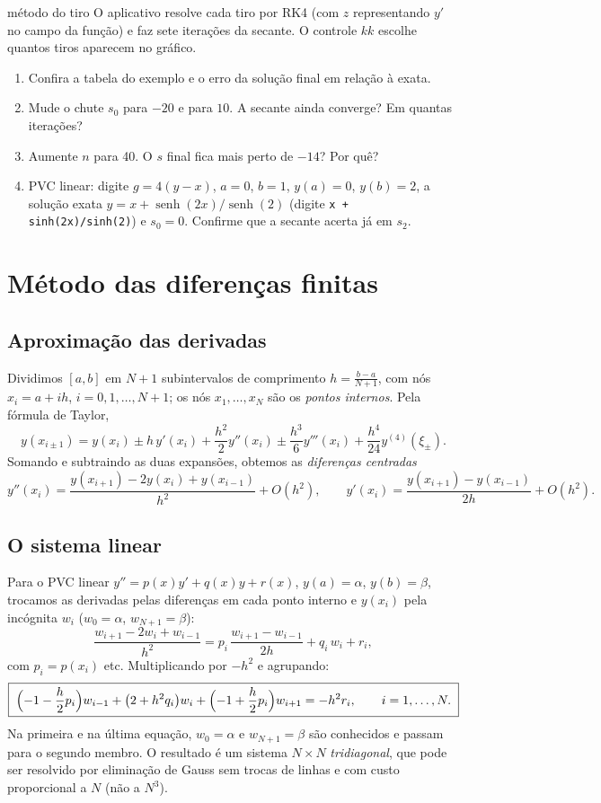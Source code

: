 \begin{atividade}{método do tiro}{\arqTiro}
O aplicativo resolve cada tiro por RK4 (com $z$ representando $y'$ no campo da função) e faz
sete iterações da secante. O controle $kk$ escolhe quantos tiros aparecem no gráfico.
\begin{enumerate}[nosep]
  \item Confira a tabela do exemplo e o erro da solução final em relação à exata.
  \item Mude o chute $s_0$ para $-20$ e para $10$. A secante ainda converge? Em quantas iterações?
  \item Aumente $n$ para 40. O $s$ final fica mais perto de $-14$? Por quê?
  \item PVC linear: digite $g=4(y-x)$, $a=0$, $b=1$, $y(a)=0$, $y(b)=2$, a solução exata
        $y=x+\operatorname{senh}(2x)/\operatorname{senh}(2)$ (digite \texttt{x + sinh(2x)/sinh(2)}) e
        $s_0=0$. Confirme que a secante acerta já em $s_2$.
\end{enumerate}
\end{atividade}

\section{Método das diferenças finitas}

\subsection{Aproximação das derivadas}

Dividimos $[a,b]$ em $N+1$ subintervalos de comprimento $h=\frac{b-a}{N+1}$, com nós
$x_i=a+ih$, $i=0,1,\dots,N+1$; os nós $x_1,\dots,x_N$ são os \emph{pontos internos}. Pela
fórmula de Taylor,
\[
y(x_{i\pm1})=y(x_i)\pm h\,y'(x_i)+\frac{h^2}{2}y''(x_i)\pm\frac{h^3}{6}y'''(x_i)+\frac{h^4}{24}y^{(4)}(\xi_\pm).
\]
Somando e subtraindo as duas expansões, obtemos as \emph{diferenças centradas}
\[
y''(x_i)=\frac{y(x_{i+1})-2y(x_i)+y(x_{i-1})}{h^2}+O(h^2),\qquad
y'(x_i)=\frac{y(x_{i+1})-y(x_{i-1})}{2h}+O(h^2).
\]

\subsection{O sistema linear}

Para o PVC linear $y''=p(x)y'+q(x)y+r(x)$, $y(a)=\alpha$, $y(b)=\beta$, trocamos as derivadas
pelas diferenças em cada ponto interno e $y(x_i)$ pela incógnita $w_i$
($w_0=\alpha$, $w_{N+1}=\beta$):
\[
\frac{w_{i+1}-2w_i+w_{i-1}}{h^2}=p_i\,\frac{w_{i+1}-w_{i-1}}{2h}+q_i\,w_i+r_i,
\]
com $p_i=p(x_i)$ etc. Multiplicando por $-h^2$ e agrupando:
\[
\boxed{\;\Bigl(-1-\frac h2p_i\Bigr)w_{i-1}+\bigl(2+h^2q_i\bigr)w_i+\Bigl(-1+\frac h2p_i\Bigr)w_{i+1}=-h^2r_i,\qquad i=1,\dots,N.\;}
\]
Na primeira e na última equação, $w_0=\alpha$ e $w_{N+1}=\beta$ são conhecidos e passam para o
segundo membro. O resultado é um sistema $N\times N$ \emph{tridiagonal}, que pode ser resolvido
por eliminação de Gauss sem trocas de linhas e com custo proporcional a $N$ (não a $N^3$).

